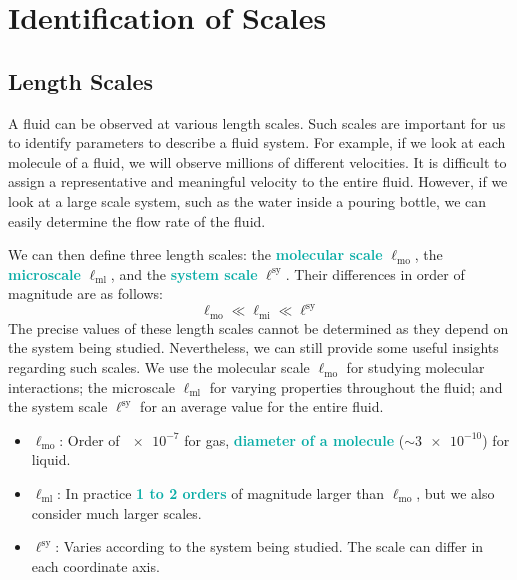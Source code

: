 \documentclass[twoside]{article}
\newcommand{\highlightbluetext}[1]{\textcolor[HTML]{09ACA6}{\textbf{#1}}}
\numberwithin{equation}{section}
\begin{document}
	\newpage
	
	\section{Identification of Scales}
	\label{sec:IdentificationOfScales}
	
	\subsection{Length Scales}
	\label{subsec:LengthScales}
	
	A fluid can be observed at various length scales. Such scales are important for us to identify parameters to describe a fluid system. For example, if we look at each molecule of a fluid, we will observe millions of different velocities. It is difficult to assign a representative and meaningful velocity to the entire fluid. However, if we look at a large scale system, such as the water inside a pouring bottle, we can easily determine the flow rate of the fluid.
	
	We can then define three length scales: the \highlightbluetext{molecular scale} $\ell_{\text{mo}}$, the \highlightbluetext{microscale} $\ell_{\text{ml}}$, and the \highlightbluetext{system scale} $\ell^{\text{sy}}$. Their differences in order of magnitude are as follows:
	\begin{equation}
		\ell_{\text{mo}} \ll \ell_{\text{mi}} \ll \ell^{\text{sy}}
		\label{eq:LengthScales}
	\end{equation}
	The precise values of these length scales cannot be determined as they depend on the system being studied. Nevertheless, we can still provide some useful insights regarding such scales. We use the molecular scale $\ell_{\text{mo}}$ for studying molecular interactions; the microscale $\ell_{\text{ml}}$ for varying properties throughout the fluid; and the system scale $\ell^{\text{sy}}$ for an average value for the entire fluid.
	\begin{itemize}
		\item $\ell_{\text{mo}}$: Order of $\num{e-7}$ for gas, \highlightbluetext{diameter of a molecule} ($\sim \num{3e-10}$) for liquid.
		\item $\ell_{\text{ml}}$: In practice \highlightbluetext{1 to 2 orders} of magnitude larger than $\ell_{\text{mo}}$, but we also consider much larger scales.
		\item $\ell^{\text{sy}}$: Varies according to the system being studied. The scale can differ in each coordinate axis.
	\end{itemize}
	
\end{document}
